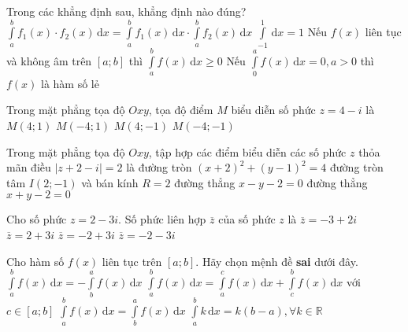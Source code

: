 \begin{ex}%
	Trong các khẳng định sau, khẳng định nào đúng?
	\choice
	{$\displaystyle\int\limits_a^b f_1(x) \cdot f_2(x) \mathrm{\,d}x=\displaystyle\int\limits_a^b f_1(x) \mathrm{\,d}x \cdot \displaystyle\int\limits_a^b f_2(x) \mathrm{\,d}x$}
	{$\displaystyle\int\limits_{-1}^1  \mathrm{\,d}x=1$}
	{\True Nếu $f(x)$  liên tục và không âm trên $[a;b]$ thì $\displaystyle\int\limits_a^b f(x)  \mathrm{\,d}x \ge 0$}
	{Nếu $\displaystyle\int\limits_0^a f(x)  \mathrm{\,d}x = 0, a>0$ thì $f(x)$ là hàm số lẻ}
	\loigiai{
		
	}
\end{ex}

\begin{ex}%
	Trong mặt phẳng tọa độ $Oxy$, tọa độ điểm $M$ biểu diễn số phức $z=4-i$ là
	\choice
	{$M(4;1)$}
	{$M(-4;1)$}
	{\True $M(4;-1)$}
	{$M(-4;-1)$}
\end{ex}

\begin{ex}%
	Trong mặt phẳng tọa độ $Oxy$, tập hợp các điểm biểu diễn các số phức $z$ thỏa mãn điều $|z+2-i|=2$ là
	\choice
	{\True đường tròn $(x+2)^2+(y-1)^2=4$}
	{đường tròn tâm $I(2;-1)$ và bán kính $R=2$}
	{đường thẳng $x-y-2=0$}
	{đường thẳng $x+y-2=0$}
\end{ex}

\begin{ex}%
	Cho số phức $z=2-3i$. Số phức liên hợp $\overline{z}$  của số phức $z$ là
	\choice
	{$\overline{z}=-3+2i$}
	{\True $\overline{z}=2+3i$}
	{$\overline{z}=-2+3i$}
	{$\overline{z}=-2-3i$}
\end{ex}

\begin{ex}%
	Cho hàm số $f(x)$  liên tục trên $[a;b]$. Hãy chọn mệnh đề \textbf{sai }dưới đây.
	\choice
	{$\displaystyle\int\limits_a^b f(x)\mathrm{\,d}x=-\displaystyle\int\limits_b^a f(x)\mathrm{\,d}x$}
	{$\displaystyle\int\limits_a^b f(x)\mathrm{\,d}x=\displaystyle\int\limits_a^c f(x)\mathrm{\,d}x+\displaystyle\int\limits_c^b f(x)\mathrm{\,d}x$ với $c \in [a;b]$}
	{\True $\displaystyle\int\limits_a^b f(x)\mathrm{\,d}x=\displaystyle\int\limits_b^a f(x)\mathrm{\,d}x$}
	{$\displaystyle\int\limits_a^b k\mathrm{\,d}x=k(b-a), \forall k \in \mathbb{R}$}
\end{ex}

